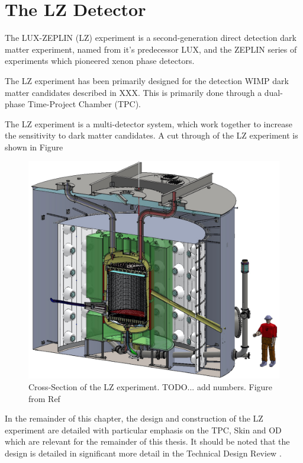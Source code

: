 \section{The LZ Detector}
\par
The LUX-ZEPLIN (LZ) experiment is a second-generation direct detection dark matter experiment, named from it's predecessor LUX, and the ZEPLIN series of experiments which pioneered xenon phase detectors.

The LZ experiment has been primarily designed for the detection WIMP dark matter candidates described in XXX. 
This is primarily done through a dual-phase Time-Project Chamber (TPC).

\par
The LZ experiment is a multi-detector system, which work together to increase the sensitivity to dark matter candidates.
A cut through of the LZ experiment is shown in Figure 

\begin{figure}
    \centering
    \includegraphics[width=\linewidth/2]{Figures/LZ/LZ_Cut_CAD.jpg}
    \caption{Cross-Section of the LZ experiment. TODO... add numbers. Figure from Ref \cite{LZ_TechnicalDesignReview_ref}}
    \label{fig:LZ_Cut_CAD}
\end{figure}



\par
In the remainder of this chapter, the design and construction of the LZ experiment are detailed with particular emphasis on the TPC, Skin and OD which are relevant for the remainder of this thesis. 
It should be noted that the design is detailed in significant more detail in the Technical Design Review \cite{LZ_TechnicalDesignReview_ref}.


